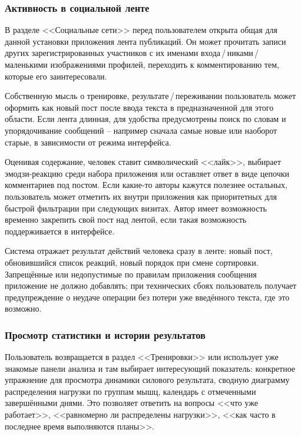 \subsubsection{Активность в социальной ленте}

В разделе <<Социальные сети>> перед пользователем открыта общая для данной установки приложения лента публикаций. Он может прочитать записи других зарегистрированных участников с их именами входа\,/\,никами\,/\,маленькими изображениями профилей, переходить к комментированию тем, которые его заинтересовали.

Собственную мысль о тренировке, результате\,/\,переживании пользователь может оформить как новый пост после ввода текста в предназначенной для этого области. Если лента длинная, для удобства предусмотрены поиск по словам и упорядочивание сообщений -- например сначала самые новые или наоборот старые, в зависимости от режима интерфейса.

Оценивая содержание, человек ставит символический <<лайк>>, выбирает эмодзи-реакцию среди набора приложения или оставляет ответ в виде цепочки комментариев под постом. Если какие-то авторы кажутся полезнее остальных, пользователь может отметить их внутри приложения как приоритетных для быстрой фильтрации при следующих визитах. Автор имеет возможность временно закрепить свой пост над лентой, если такая возможность поддерживается в интерфейсе.

Система отражает результат действий человека сразу в ленте: новый пост, обновившийся список реакций, новый порядок при смене сортировки. Запрещённые или недопустимые по правилам приложения сообщения приложение не должно добавлять; при технических сбоях пользователь получает предупреждение о неудаче операции без потери уже введённого текста, где это возможно.

\subsubsection{Просмотр статистики и истории результатов}

Пользователь возвращается в раздел <<Тренировки>> или использует уже знакомые панели анализа и там выбирает интересующий показатель: конкретное упражнение для просмотра динамики силового результата, сводную диаграмму распределения нагрузки по группам мышц, календарь с отмеченными завершёнными днями. Это позволяет ответить на вопросы <<что уже работает>>, <<равномерно ли распределены нагрузки>>, <<как часто в последнее время выполняются планы>>.

